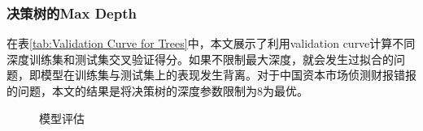 \documentclass{article}
\begin{document}
\subsubsection{决策树的Max Depth}
\par 在表\ref{tab:Validation Curve for Trees}中，本文展示了利用validation curve计算不同深度训练集和测试集交叉验证得分。如果不限制最大深度，就会发生过拟合的问题，即模型在训练集与测试集上的表现发生背离。对于中国资本市场侦测财报错报的问题，本文的结果是将决策树的深度参数限制为8为最优。
\begin{figure}[htbp]
    \centering
    \caption{模型评估}
\end{figure}
\end{document}
